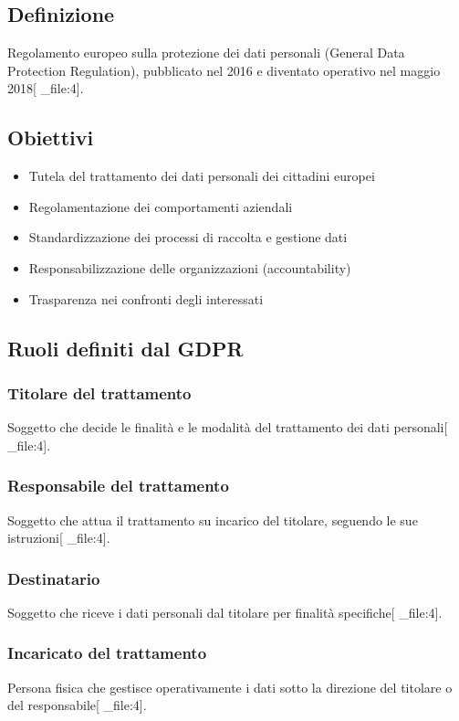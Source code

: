 \documentclass[12pt,a4paper]{article}
\begin{document}
\subsection{Definizione}
Regolamento europeo sulla protezione dei dati personali (General Data Protection Regulation), pubblicato nel 2016 e diventato operativo nel maggio 2018[ _file:4].

\subsection{Obiettivi}
\begin{itemize}
    \item Tutela del trattamento dei dati personali dei cittadini europei
    \item Regolamentazione dei comportamenti aziendali
    \item Standardizzazione dei processi di raccolta e gestione dati
    \item Responsabilizzazione delle organizzazioni (accountability)
    \item Trasparenza nei confronti degli interessati
\end{itemize}

\subsection{Ruoli definiti dal GDPR}

\subsubsection{Titolare del trattamento}
Soggetto che decide le finalità e le modalità del trattamento dei dati personali[ _file:4].

\subsubsection{Responsabile del trattamento}
Soggetto che attua il trattamento su incarico del titolare, seguendo le sue istruzioni[ _file:4].

\subsubsection{Destinatario}
Soggetto che riceve i dati personali dal titolare per finalità specifiche[ _file:4].

\subsubsection{Incaricato del trattamento}
Persona fisica che gestisce operativamente i dati sotto la direzione del titolare o del responsabile[ _file:4].
\end{document}
